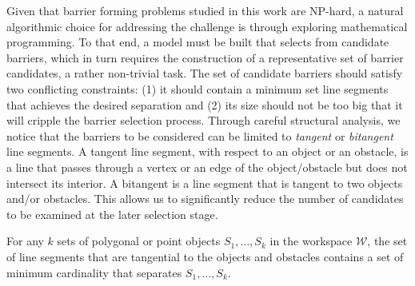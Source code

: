 
Given that barrier forming problems studied in this work are NP-hard, a natural algorithmic choice for addressing the challenge is through exploring  mathematical programming.
%
To that end, a model must be built that selects from candidate barriers, which in turn requires the construction of a representative set of barrier candidates, a rather non-trivial task. 
%
The set of candidate barriers should satisfy two conflicting constraints: (1) it should contain a minimum set line segments that achieves the desired separation and (2) its size should not be too big that it will cripple the barrier selection process. 
%
Through careful structural analysis, we notice that the barriers to be considered can be limited to \emph{tangent} or \emph{bitangent} line segments. A tangent line segment, with respect to an object or an obstacle, is a line that passes through a vertex or an edge of the object/obstacle but does not intersect its interior. A bitangent is a line segment that is tangent to two objects and/or obstacles. 
%
This allows us to significantly reduce the number of candidates to be examined at the later selection stage.

\begin{theorem}\label{theorem:bf-sin_tan}
For any $k$ sets of polygonal or point objects $S_1, \dots, S_k$ in the workspace $\mathcal W$, the set of line segments that are tangential to the objects and obstacles contains a set of minimum cardinality that separates $S_1, \dots, S_k$. 
\end{theorem}


